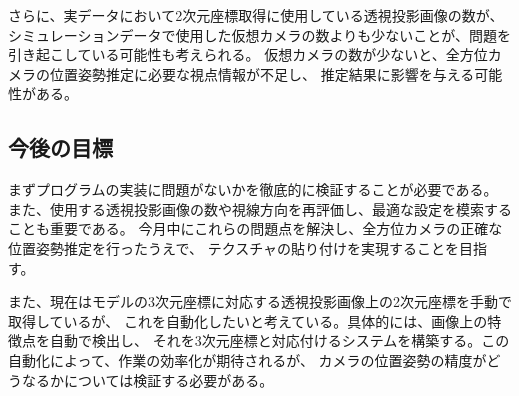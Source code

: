 \documentclass[]{jarticle}          %
\begin{document}
さらに、実データにおいて2次元座標取得に使用している透視投影画像の数が、
シミュレーションデータで使用した仮想カメラの数よりも少ないことが、問題を引き起こしている可能性も考えられる。
仮想カメラの数が少ないと、全方位カメラの位置姿勢推定に必要な視点情報が不足し、
推定結果に影響を与える可能性がある。

\subsection{今後の目標}
まずプログラムの実装に問題がないかを徹底的に検証することが必要である。
また、使用する透視投影画像の数や視線方向を再評価し、最適な設定を模索することも重要である。
今月中にこれらの問題点を解決し、全方位カメラの正確な位置姿勢推定を行ったうえで、
テクスチャの貼り付けを実現することを目指す。

また、現在はモデルの3次元座標に対応する透視投影画像上の2次元座標を手動で取得しているが、
これを自動化したいと考えている。具体的には、画像上の特徴点を自動で検出し、
それを3次元座標と対応付けるシステムを構築する。この自動化によって、作業の効率化が期待されるが、
カメラの位置姿勢の精度がどうなるかについては検証する必要がある。
\end{document}
